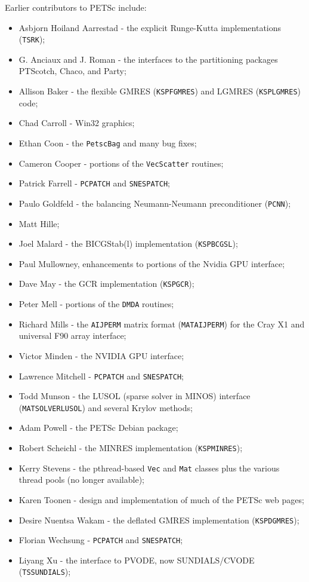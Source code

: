 \noindent 
Earlier contributors to PETSc include:
\begin{itemize}
  \item Asbjorn Hoiland Aarrestad - the explicit Runge-Kutta implementations (\lstinline{TSRK});
  \item G. Anciaux and J. Roman - the interfaces to the partitioning packages PTScotch, Chaco, and Party;
  \item Allison Baker - the flexible GMRES (\lstinline{KSPFGMRES}) and LGMRES (\lstinline{KSPLGMRES}) code;
  \item Chad Carroll - Win32 graphics;
  \item Ethan Coon - the \lstinline{PetscBag} and many bug fixes;
  \item Cameron Cooper - portions of the \lstinline{VecScatter} routines;
  \item Patrick Farrell - \lstinline{PCPATCH} and \lstinline{SNESPATCH};
  \item Paulo Goldfeld - the balancing Neumann-Neumann preconditioner (\lstinline{PCNN});
  \item Matt Hille;
  \item Joel Malard - the BICGStab(l) implementation (\lstinline{KSPBCGSL});
  \item Paul Mullowney, enhancements to portions of the Nvidia GPU interface;
  \item Dave May - the GCR implementation (\lstinline{KSPGCR});
  \item Peter Mell - portions of the \lstinline{DMDA} routines;
  \item Richard Mills - the \lstinline{AIJPERM} matrix format (\lstinline{MATAIJPERM}) for the Cray X1 and universal F90 array interface;
  \item Victor Minden - the NVIDIA GPU interface;
  \item Lawrence Mitchell - \lstinline{PCPATCH} and \lstinline{SNESPATCH};
  \item Todd Munson - the LUSOL (sparse solver in MINOS) interface (\lstinline{MATSOLVERLUSOL}) and several Krylov methods;
  \item Adam Powell - the PETSc Debian package;
  \item Robert Scheichl - the MINRES implementation (\lstinline{KSPMINRES});
  \item Kerry Stevens - the pthread-based \lstinline{Vec} and \lstinline{Mat} classes plus the various thread pools (no longer available);
  \item Karen Toonen - design and implementation of much of the PETSc web pages;
  \item Desire Nuentsa Wakam - the deflated GMRES implementation (\lstinline{KSPDGMRES});
  \item Florian Wechsung - \lstinline{PCPATCH} and \lstinline{SNESPATCH};
  \item Liyang Xu - the interface to PVODE, now SUNDIALS/CVODE (\lstinline{TSSUNDIALS});
\end{itemize}

